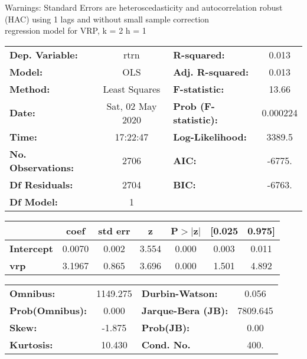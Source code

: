 Warnings: \newline
 [1] Standard Errors are heteroscedasticity and autocorrelation robust (HAC) using 1 lags and without small sample correction\\ 

regression model for VRP, k = 2 h = 1\begin{center}
\begin{tabular}{lclc}
\toprule
\textbf{Dep. Variable:}    &       rtrn       & \textbf{  R-squared:         } &     0.013   \\
\textbf{Model:}            &       OLS        & \textbf{  Adj. R-squared:    } &     0.013   \\
\textbf{Method:}           &  Least Squares   & \textbf{  F-statistic:       } &     13.66   \\
\textbf{Date:}             & Sat, 02 May 2020 & \textbf{  Prob (F-statistic):} &  0.000224   \\
\textbf{Time:}             &     17:22:47     & \textbf{  Log-Likelihood:    } &    3389.5   \\
\textbf{No. Observations:} &        2706      & \textbf{  AIC:               } &    -6775.   \\
\textbf{Df Residuals:}     &        2704      & \textbf{  BIC:               } &    -6763.   \\
\textbf{Df Model:}         &           1      & \textbf{                     } &             \\
\bottomrule
\end{tabular}
\begin{tabular}{lcccccc}
                   & \textbf{coef} & \textbf{std err} & \textbf{z} & \textbf{P$> |$z$|$} & \textbf{[0.025} & \textbf{0.975]}  \\
\midrule
\textbf{Intercept} &       0.0070  &        0.002     &     3.554  &         0.000        &        0.003    &        0.011     \\
\textbf{vrp}       &       3.1967  &        0.865     &     3.696  &         0.000        &        1.501    &        4.892     \\
\bottomrule
\end{tabular}
\begin{tabular}{lclc}
\textbf{Omnibus:}       & 1149.275 & \textbf{  Durbin-Watson:     } &    0.056  \\
\textbf{Prob(Omnibus):} &   0.000  & \textbf{  Jarque-Bera (JB):  } & 7809.645  \\
\textbf{Skew:}          &  -1.875  & \textbf{  Prob(JB):          } &     0.00  \\
\textbf{Kurtosis:}      &  10.430  & \textbf{  Cond. No.          } &     400.  \\
\bottomrule
\end{tabular}
\end{center}

